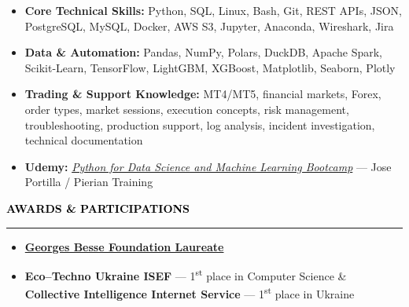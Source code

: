 \documentclass[10pt,english,french]{article}
\newcommand{\awardIcon}[1][black]{\textcolor{#1}{\faTrophy}}
\newcommand{\cvsection}[1]{
    \vspace{4pt}
    \textbf{\fontsize{9pt}{10pt}\selectfont \textcolor{black}{#1}}
    \vspace{6pt}
    \hrule
    \vspace{6pt}
}
\begin{document}
\vspace{-4pt}
\begin{itemize}[leftmargin=0.5cm, label=\textbullet, itemsep=0.2em]
    \item \textbf{Core Technical Skills:} Python, SQL, Linux, Bash, Git, REST APIs, JSON, PostgreSQL, MySQL, Docker, AWS S3, Jupyter, Anaconda, Wireshark, Jira
    \item \textbf{Data \& Automation:} Pandas, NumPy, Polars, DuckDB, Apache Spark, Scikit-Learn, TensorFlow, LightGBM, XGBoost, Matplotlib, Seaborn, Plotly
    \item \textbf{Trading \& Support Knowledge:} MT4/MT5, financial markets, Forex, order types, market sessions, execution concepts, risk management, troubleshooting, production support, log analysis, incident investigation, technical documentation
    \item \textbf{Udemy:} \href{https://www.udemy.com/certificate/UC-51319000-ccb8-4c9c-9320-6cd9860e601c/}{\textit{Python for Data Science and Machine Learning Bootcamp}} --- Jose Portilla / Pierian Training
\end{itemize}

\vspace{-3pt}
\cvsection{\awardIcon[black]\hspace{4pt}AWARDS \& PARTICIPATIONS}

\vspace{-6pt}
\begin{itemize}[leftmargin=0.35cm, label=\textbullet, itemsep=0.15em]
    \item \textbf{\href{https://www.fondationbesse.com/}{Georges Besse Foundation Laureate}}
    \item \textbf{Eco\hspace{3pt}--\hspace{3pt}Techno Ukraine ISEF} --- 1\textsuperscript{st} place in Computer Science \& \textbf{Collective Intelligence Internet Service} --- 1\textsuperscript{st} place in Ukraine
\end{itemize}
\end{document}
